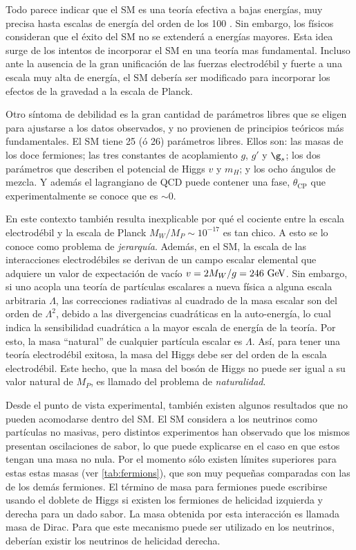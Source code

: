 Todo parece indicar que el SM es una teoría efectiva a bajas energías, muy precisa hasta
escalas de energía del orden de los 100 {\gev}. Sin embargo, los físicos
consideran que el éxito del SM no se extenderá a energías mayores. Esta
idea surge de los intentos de incorporar el SM en una teoría mas
fundamental. Incluso ante la ausencia de la gran unificación de las fuerzas
electrodébil y fuerte a una escala muy alta de energía, el SM debería ser
modificado para incorporar los efectos de la gravedad a la escala de Planck.

Otro síntoma de debilidad es la gran cantidad de parámetros
libres que se eligen para ajustarse a los datos observados, y no provienen de
principios teóricos más fundamentales.
El SM tiene 25 (ó 26) parámetros libres. Ellos son: las masas de los doce fermiones;
las tres constantes de acoplamiento $g$, $g'$ y $\g_s$; los dos parámetros que
describen el potencial de Higgs $v$ y $m_H$; y los ocho ángulos de mezcla. Y
además el lagrangiano de QCD puede contener una fase, $\theta_{\text{CP}}$ que
experimentalmente se conoce que es $\sim 0$.

En este contexto también resulta inexplicable por qué el cociente entre la escala
electrodébil y la escala de Planck $M_W/M_P \sim
10^{-17}$ es tan chico. A esto se lo conoce como problema de \emph{jerarquía}.
Además, en el SM, la escala de las interacciones electrodébiles se derivan de un
campo escalar elemental que adquiere un valor de expectación de vacío $v = 2
M_W /g = 246 \gev$. Sin embargo, si uno acopla una teoría de partículas
escalares a nueva física a alguna escala arbitraria $\Lambda$, las correcciones
radiativas al cuadrado de la masa escalar son del orden de $\Lambda^2$, debido a
las divergencias cuadráticas en la auto-energía, lo cual indica la sensibilidad
cuadrática a la mayor escala de energía de la teoría. Por esto, la masa
``natural'' de cualquier partícula escalar es $\Lambda$. Así, para tener una teoría
electrodébil exitosa, la masa del Higgs debe ser del orden de la escala
electrodébil. Este hecho, que la masa del bosón de Higgs no puede ser igual a su
valor natural de $M_P$, es llamado del problema de \emph{naturalidad}.

Desde el punto de vista experimental, también existen algunos resultados que no
pueden acomodarse dentro del SM. El SM considera a los neutrinos como partículas
no masivas, pero distintos
experimentos\cite{PhysRevLett.101.111301,PhysRevD.78.032002} han observado
que los mismos presentan oscilaciones de sabor, lo que puede explicarse en el caso en
que estos tengan una masa no nula. Por el momento sólo existen límites
superiores para estas estas masas (ver \cref{tab:fermions}), que son muy peque\~nas
comparadas con las de los demás fermiones. El término de
masa para fermiones puede escribirse usando el doblete de Higgs si existen los
fermiones de helicidad izquierda y derecha para un dado sabor. La masa obtenida
por esta interacción es llamada masa de Dirac. Para que este mecanismo puede ser
utilizado en los neutrinos, deberían existir los neutrinos de helicidad derecha.


